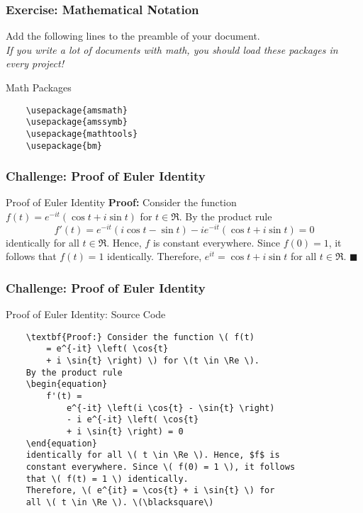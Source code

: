 

\begin{frame}[fragile]
\frametitle{Exercise: Mathematical Notation}
Add the following lines to the preamble of your document. \\
\textit{\small If you write a lot of documents with math, you should load these packages in every project!} \\
\begin{alertblock}{Math Packages}
    \small
    \begin{verbatim}
    \usepackage{amsmath}
    \usepackage{amssymb}
    \usepackage{mathtools}
    \usepackage{bm}
    \end{verbatim}
\end{alertblock}
\end{frame}


\begin{frame}[fragile]
\frametitle{Challenge: Proof of Euler Identity} 
\begin{alertblock}{Proof of Euler Identity}
    \textbf{Proof:} Consider the function \( f(t) = e^{-it} \left( \cos{t} + i \sin{t} \right) \) for \(t \in \Re \). 
    By the product rule
    \begin{equation}\tag{1}
        f'(t) 
            = e^{-it} \left(i \cos{t} 
            - \sin{t} \right) 
            - i e^{-it} \left( \cos{t} 
            + i \sin{t} \right) 
        = 0
    \end{equation}
    identically for all \( t \in \Re \). Hence, $f$ is constant everywhere. Since \( f(0) = 1 \), it follows that \( f(t) = 1 \) identically. Therefore, \( e^{it} = \cos{t} + i \sin{t} \) for all \( t \in \Re \). \(\blacksquare\)
\end{alertblock}
\end{frame}


\begin{frame}[fragile]
\frametitle{Challenge: Proof of Euler Identity} 
\begin{alertblock}{Proof of Euler Identity: Source Code}
    \small
    \begin{verbatim}
    \textbf{Proof:} Consider the function \( f(t) 
        = e^{-it} \left( \cos{t} 
        + i \sin{t} \right) \) for \(t \in \Re \). 
    By the product rule
    \begin{equation}
        f'(t) = 
            e^{-it} \left(i \cos{t} - \sin{t} \right) 
            - i e^{-it} \left( \cos{t}  
            + i \sin{t} \right) = 0
    \end{equation}
    identically for all \( t \in \Re \). Hence, $f$ is 
    constant everywhere. Since \( f(0) = 1 \), it follows 
    that \( f(t) = 1 \) identically. 
    Therefore, \( e^{it} = \cos{t} + i \sin{t} \) for 
    all \( t \in \Re \). \(\blacksquare\)
    \end{verbatim}
\end{alertblock}
\end{frame}


